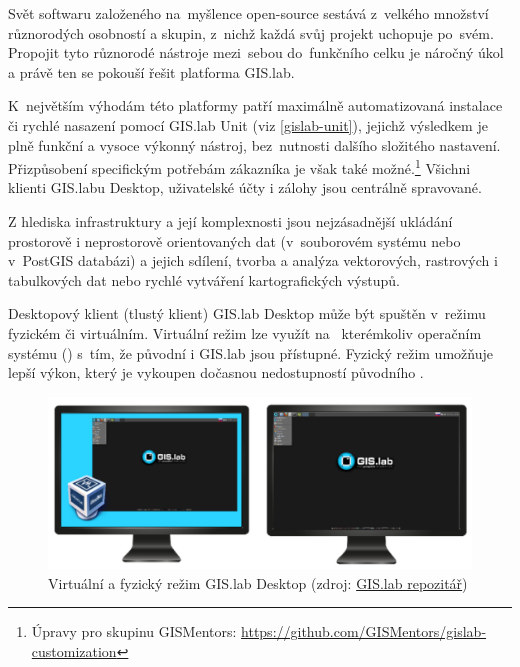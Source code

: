 Svět softwaru založeného na~myšlence open-source sestává z~velkého
množství různorodých osobností a skupin, z~nichž každá svůj projekt
uchopuje po~svém. Propojit tyto různorodé nástroje mezi~sebou do~funkčního 
celku je náročný úkol a právě ten se pokouší řešit platforma
GIS.lab.

K~největším výhodám této platformy patří maximálně automatizovaná
instalace či rychlé nasazení pomocí GIS.lab Unit (viz
\ref{gislab-unit}), jejichž výsledkem je plně funkční a vysoce výkonný
nástroj, bez~nutnosti dalšího složitého nastavení. Přizpůsobení
specifickým potřebám zákazníka je však také možné.\footnote{Úpravy pro
  skupinu GISMentors:
  \href{https://github.com/GISMentors/gislab-customization}{https://github.com/GISMentors/gislab-customization}}
Všichni klienti GIS.labu Desktop, uživatelské účty i zálohy jsou
centrálně spravované.

Z hlediska  infrastruktury a její komplexnosti jsou
nejzásadnější ukládání prostorově i neprostorově orientovaných dat (v~souborovém 
systému nebo v~PostGIS databázi) a jejich sdílení, tvorba a
analýza vektorových, rastrových i tabulkových dat nebo rychlé
vytváření kartografických výstupů.

Desktopový klient (tlustý klient) GIS.lab Desktop může být spuštěn v~režimu 
fyzickém či virtuálním. Virtuální režim lze využít na~ kterémkoliv operačním systému () s~tím, že původní  i
GIS.lab jsou přístupné. Fyzický režim umožňuje lepší výkon, který je
vykoupen dočasnou nedostupností původního . \cite{gislab-doc}

\begin{figure}[H] \centering
    \includegraphics[width=450pt]{./pictures/physical-or-virtual-mode.png}
    \caption[Virtuální a fyzický režim GIS.lab Desktop]{Virtuální a fyzický režim GIS.lab Desktop (zdroj:
	\href{https://github.com/gislab-npo/gislab-doc/blob/master/img/installation/physical-or-virtual-mode.png}{GIS.lab repozitář})}
	\label{fig:gislab-rezim}
\end{figure}

